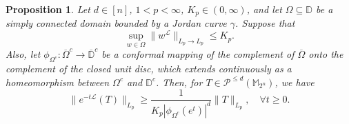 \documentclass{amsbook}
\newtheorem{proposition}[theorem]{Proposition}
\theoremstyle{definition}
\theoremstyle{remark}
\numberwithin{section}{chapter}
\numberwithin{equation}{chapter}
\newcommand{\1}{\mathbf{1}}
\begin{document}
\begin{proposition}\label{Cpro-Reverse}
Let $ d \in [n]$, $1<p<\infty$, $K_p \in(0, \infty)$, and let $\Omega \subseteq \mathbb{D}$ be a simply connected domain bounded by a Jordan curve $\gamma$. Suppose that
\begin{equation}\label{omega-K}
\sup _{w \in \Omega} \|w^{\mathcal{L}}\|_{L_{p}\rightarrow L_{p}} \leq K_p.
\end{equation}
Also, let $\phi_{\Omega^{c}}: \overline{\Omega}^{c} \rightarrow \overline{\mathbb{D}}^{c}$ be a conformal mapping of the complement of $\overline{\Omega}$ onto the complement of the closed unit disc, which extends continuously as a homeomorphism between $\Omega^{c}$ and $\mathbb{D}^{c}$. Then, for  $T\in \mathcal{P}^{\leq d}(\mathbb{M}_{2^n})$,  we have
$$\|e^{-t \mathcal{L}} (T)\|_{L_{p}} \geq \frac{1}{K_p|\phi_{\Omega^{c}}(e^{t})|^{d}}\|T\|_{L_{p}},\quad \forall t \geq 0.
$$
\end{proposition}
\end{document}
